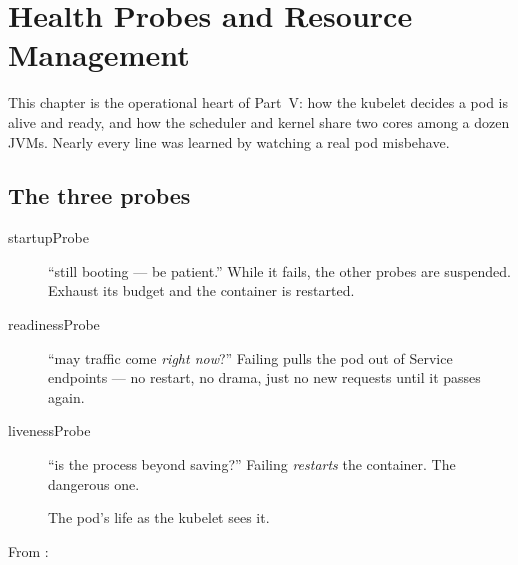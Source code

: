 \chapter{Health Probes and Resource Management}
\label{ch:probes}

This chapter is the operational heart of Part~V: how the kubelet decides
a pod is alive and ready, and how the scheduler and kernel share two
cores among a dozen JVMs. Nearly every line was learned by watching a
real pod misbehave.

\section{The three probes}

\begin{description}
  \item[startupProbe] ``still booting --- be patient.'' While it fails,
  the other probes are suspended. Exhaust its budget and the container
  is restarted.
  \item[readinessProbe] ``may traffic come \emph{right now}?'' Failing
  pulls the pod out of Service endpoints --- no restart, no drama, just
  no new requests until it passes again.
  \item[livenessProbe] ``is the process beyond saving?'' Failing
  \emph{restarts} the container. The dangerous one.
\end{description}

\begin{figure}[h]
\centering
{}
\caption{The pod's life as the kubelet sees it.}
\end{figure}

From :

